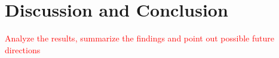 \section{Discussion and Conclusion} \label{conclusion}
\textcolor{red}{
Analyze the results, summarize the findings and point out possible future directions
}